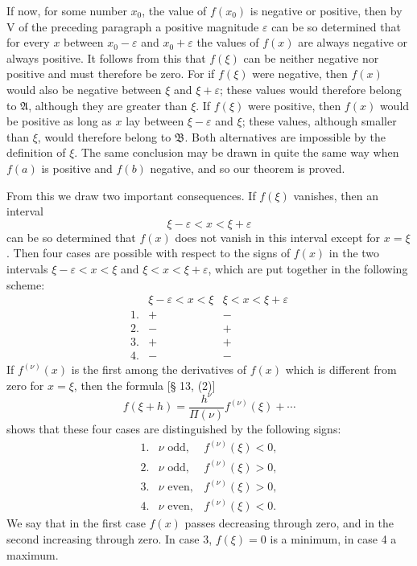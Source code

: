 \documentclass[11pt]{article}
\begin{document}
If now, for some number $x_0$, the value of $f(x_0)$ is negative or positive, then by V of the preceding paragraph a positive magnitude $\varepsilon$ can be so determined that for every $x$ between $x_0-\varepsilon$ and $x_0+\varepsilon$ the values of $f(x)$ are always negative or always positive. It follows from this that $f(\xi)$ can be neither negative nor positive and must therefore be zero. For if $f(\xi)$ were negative, then $f(x)$ would also be negative between $\xi$ and $\xi+\varepsilon$; these values would therefore belong to $\mathfrak A$, although they are greater than $\xi$. If $f(\xi)$ were positive, then $f(x)$ would be positive as long as $x$ lay between $\xi-\varepsilon$ and $\xi$; these values, although smaller than $\xi$, would therefore belong to $\mathfrak B$. Both alternatives are impossible by the definition of $\xi$. The same conclusion may be drawn in quite the same way when $f(a)$ is positive and $f(b)$ negative, and so our theorem is proved.

From this we draw two important consequences. If $f(\xi)$ vanishes, then an interval
\[
 \xi-\varepsilon<x<\xi+\varepsilon
\]
can be so determined that $f(x)$ does not vanish in this interval except for $x=\xi$. Then four cases are possible with respect to the signs of $f(x)$ in the two intervals $\xi-\varepsilon<x<\xi$ and $\xi<x<\xi+\varepsilon$, which are put together in the following scheme:
\[
\begin{array}{c|cc}
&\xi-\varepsilon<x<\xi&\xi<x<\xi+\varepsilon\\
1.&+&-\\
2.&-&+\\
3.&+&+\\
4.&-&-
\end{array}
\]
If $f^{(\nu)}(x)$ is the first among the derivatives of $f(x)$ which is different from zero for $x=\xi$, then the formula [§ 13, (2)]
\[
 f(\xi+h)=\frac{h^\nu}{\Pi(\nu)}f^{(\nu)}(\xi)+\cdots
\]
shows that these four cases are distinguished by the following signs:
\[
\begin{array}{lll}
1.&\nu\text{ odd},& f^{(\nu)}(\xi)<0,\\
2.&\nu\text{ odd},& f^{(\nu)}(\xi)>0,\\
3.&\nu\text{ even},& f^{(\nu)}(\xi)>0,\\
4.&\nu\text{ even},& f^{(\nu)}(\xi)<0.
\end{array}
\]
We say that in the first case $f(x)$ passes decreasing through zero, and in the second increasing through zero. In case 3, $f(\xi)=0$ is a minimum, in case 4 a maximum.
\end{document}
